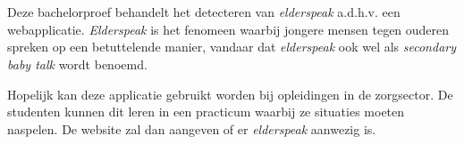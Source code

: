 
%
%

%



\chapter*{}

Deze bachelorproef behandelt het detecteren van \textit{elderspeak} a.d.h.v. een webapplicatie. \textit{Elderspeak} is het fenomeen waarbij jongere mensen tegen ouderen spreken op een betuttelende manier,  vandaar dat \textit{elderspeak} ook wel als \textit{secondary baby talk} wordt benoemd.

Hopelijk kan deze applicatie gebruikt worden bij opleidingen in de zorgsector. De studenten kunnen dit leren in een practicum waarbij ze situaties moeten naspelen. De website zal dan aangeven of er \textit{elderspeak} aanwezig is.

